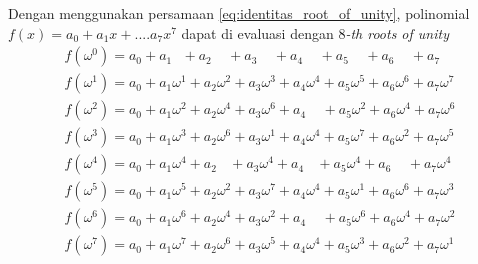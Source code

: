 Dengan menggunakan persamaan \eqref{eq:identitas_root_of_unity}, polinomial $ f(x) = a_0 + a_1x + .... a_7x^7 $ dapat di evaluasi dengan $8$\textit{-th roots of unity}
\begin{equation}
	\begin{aligned}
		f(\omega^0) = a_0 + a_1 \ \ \   + a_2\ \ \ \ \ + a_3\ \ \ \ \ + a_4\ \ \ \ \ + a_5\ \ \ \ \ + a_6\ \ \ \ \ + a_7  \ \ \ \ \\ 
		f(\omega^1) = a_0 + a_1\omega^1 + a_2\omega^2 + a_3\omega^3 + a_4\omega^4 + a_5\omega^5 + a_6\omega^6 + a_7\omega^7 \\ 
		f(\omega^2) = a_0 + a_1\omega^2 + a_2\omega^4 + a_3\omega^6 + a_4\ \ \ \ \ + a_5\omega^2 + a_6\omega^4 + a_7\omega^6 \\ 
		f(\omega^3) = a_0 + a_1\omega^3 + a_2\omega^6 + a_3\omega^1 + a_4\omega^4 + a_5\omega^7 + a_6\omega^2 + a_7\omega^5 \\ 
		f(\omega^4) = a_0 + a_1\omega^4 + a_2\ \ \ \  + a_3\omega^4 + a_4\ \ \ \  + a_5\omega^4 + a_6\ \ \ \ \ + a_7\omega^4 \\ 
		f(\omega^5) = a_0 + a_1\omega^5 + a_2\omega^2 + a_3\omega^7 + a_4\omega^4 + a_5\omega^1 + a_6\omega^6 + a_7\omega^3 \\ 
		f(\omega^6) = a_0 + a_1\omega^6 + a_2\omega^4 + a_3\omega^2 + a_4\ \ \ \ \ + a_5\omega^6 + a_6\omega^4 + a_7\omega^2 \\ 
		f(\omega^7) = a_0 + a_1\omega^7 + a_2\omega^6 + a_3\omega^5 + a_4\omega^4 + a_5\omega^3 + a_6\omega^2 + a_7\omega^1 \\ 
	\end{aligned}
	\label{eq:evaluasi_fft}
\end{equation}

